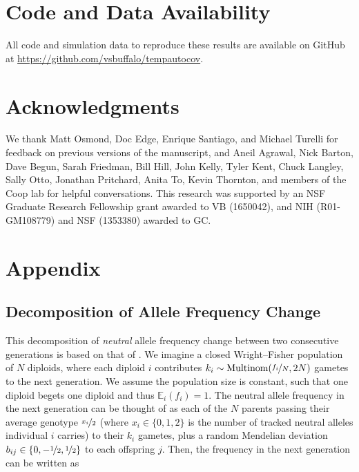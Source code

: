 \documentclass[11pt]{article}
\newcommand{\E}{\mathbb{E}}
\begin{document}
\section{Code and Data Availability}

All code and simulation data to reproduce these results are available on GitHub
at \url{https://github.com/vsbuffalo/tempautocov}.

\section{Acknowledgments}

We thank Matt Osmond, Doc Edge, Enrique Santiago, and Michael Turelli for
feedback on previous versions of the manuscript, and Aneil Agrawal, Nick
Barton, Dave Begun, Sarah Friedman, Bill Hill, John Kelly, Tyler Kent, Chuck
Langley, Sally Otto, Jonathan Pritchard, Anita To, Kevin Thornton, and members
of the Coop lab for helpful conversations. This research was supported by an
NSF Graduate Research Fellowship grant awarded to VB (1650042), and NIH
(R01-GM108779) and NSF (1353380) awarded to GC.

\printbibliography


\newpage


\appendix

\section{Appendix} 

\subsection{Decomposition of Allele Frequency Change}
\label{ap:decomp}

This decomposition of \emph{neutral} allele frequency change between two
consecutive generations is based on that of \textcite{Santiago1995-hx}. We
imagine a closed Wright--Fisher population of $N$ diploids, where each diploid
$i$ contributes $k_i \sim \text{Multinom}(\nicefrac{f_i}{N}, 2N)$ gametes to
the next generation. We assume the population size is constant, such that one
diploid begets one diploid and thus $\E_i(f_i) = 1$. The neutral allele
frequency in the next generation can be thought of as each of the $N$ parents
passing their average genotype $\nicefrac{x_i}{2}$ (where $x_i \in\{0, 1, 2\}$
is the number of tracked neutral alleles individual $i$ carries) to their $k_i$
gametes, plus a random Mendelian deviation $b_{ij} \in \{0, -\nicefrac{1}{2},
\nicefrac{1}{2}\}$ to each offspring $j$. Then, the frequency in the next
generation can be written as
\end{document}
